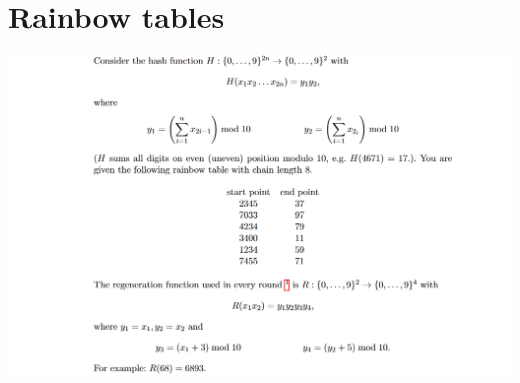 
\graphicspath{ {./src/} } 
\usepackage{hyperref}

\newcommand{\dozent}{Volker Roth}
\newcommand{\tutor}{Oliver Wiese}
\newcommand{\tutoriumNo}{02\\Materialien: Latex, VSC, Skript}
\newcommand{\ubungNo}{07}
\newcommand{\veranstaltung}{Rechnersicherheit}
\newcommand{\semester}{SoSe 21}




\section{Rainbow tables}
\includegraphics[width=\textwidth]{src/u7/task1.png}
